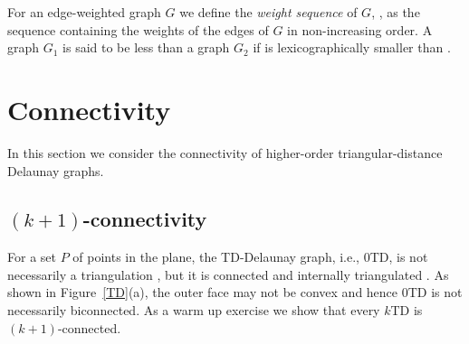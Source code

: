 \documentclass[11pt,a4paper]{article}
\newcommand{\kTD}[2]{$#1$\text{-}TD#2}
\newcommand{\WS}[1]{\text{WS$(#1)$}}
\begin{document}
For an edge-weighted graph $G$ we define the {\em weight sequence} of $G$, \WS{G}, as the sequence containing the weights of the edges of $G$ in non-increasing order. A graph $G_1$ is said to be less than a graph $G_2$ if \WS{G_1} is lexicographically smaller than \WS{G_2}.

\section{Connectivity}
\label{connectivity}
In this section we consider the connectivity of higher-order triangular-distance Delaunay graphs.

\subsection{$(k+1)$-connectivity}
\label{connectivity-k-plus-1}
For a set $P$ of points in the plane, the TD-Delaunay graph, i.e., \kTD{0}{}, is not necessarily a triangulation \cite{Chew1989}, but it is connected and internally triangulated \cite{Babu2013}. As shown in Figure~\ref{TD}(a), the outer face may not be convex and hence \kTD{0}{} is not necessarily biconnected. As a warm up exercise we show that every \kTD{k}{} is $(k+1)$-connected. 
\end{document}

